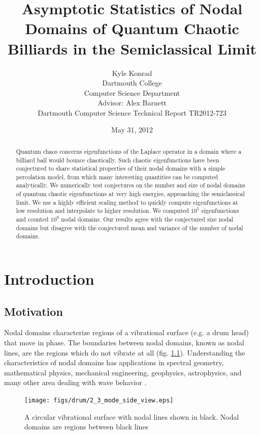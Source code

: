 \documentclass{report}
\begin{document}
\title{Asymptotic Statistics of Nodal Domains of Quantum Chaotic Billiards in the Semiclassical Limit}
\author{Kyle Konrad\\
  Dartmouth College\\
  Computer Science Department\\
  Advisor: Alex Barnett\\
  Dartmouth Computer Science Technical Report TR2012-723}
\date{May 31, 2012}

\maketitle

\begin{abstract}
  Quantum chaos concerns eigenfunctions of the Laplace operator in a domain where a billiard ball would bounce chaotically.
Such chaotic eigenfunctions have been conjectured to share statistical properties of their nodal domains with a simple percolation model, from which many interesting quantities can be computed analytically. We numerically test conjectures on the number and size of nodal domains of quantum chaotic eigenfunctions at very high energies, approaching the semiclassical limit. We use a highly efficient scaling method to quickly compute eigenfunctions at low resolution and interpolate to higher resolution. We computed $10^{5}$ eigenfunctions and counted $10^{9}$ nodal domains. Our results agree with the conjectured size nodal domains but disagree with the conjectured mean and variance of the number of nodal domains.
\end{abstract}

\chapter{Introduction}
\label{chap:intro}
\section{Motivation}
\label{sec:motivation}
Nodal domains characterize regions of a vibrational surface (e.g. a drum head) that move in phase. The boundaries between nodal domains, known as nodal lines, are the regions which do not vibrate at all (fig. \ref{fig:drum}). Understanding the characteristics of nodal domains has applications in spectral geometry, mathematical physics, mechanical engineering, geophysics, astrophysics, and many other area dealing with wave behavior \cite{wigman}.

\begin{figure}
  \begin{center}
    \texttt{[image: figs/drum/2\_3\_mode\_side\_view.eps]}
    \caption{A circular vibrational surface with nodal lines shown in black. Nodal domains are regions between black lines}
    \label{fig:drum}
  \end{center}
\end{figure}
\end{document}
